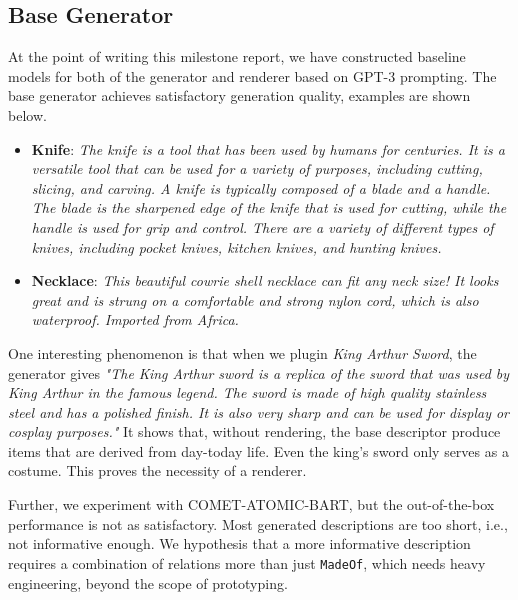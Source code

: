 \documentclass[12pt]{article}
\begin{document}
  \subsection{Base Generator}
    At the point of writing this milestone report, we have constructed baseline models for both of 
      the generator and renderer based on GPT-3 prompting. The base generator achieves satisfactory 
      generation quality, examples are shown below.
      \begin{itemize}
        \item \textbf{Knife}: \textit{The knife is a tool that has been used by humans for centuries. It is a versatile tool that can be used for a variety of purposes, 
          including cutting, slicing, and carving. A knife is typically composed of a blade and a handle. 
          The blade is the sharpened edge of the knife that is used for cutting, while the handle is used 
          for grip and control. There are a variety of different types of knives, including pocket knives, 
          kitchen knives, and hunting knives.} 
        \item \textbf{Necklace}: \textit{This beautiful cowrie shell necklace can fit any neck size! 
          It looks great and is strung on a comfortable and strong nylon cord, which is also waterproof. 
          Imported from Africa.}
      \end{itemize}

    One interesting phenomenon is that when we plugin \textit{King Arthur Sword}, the generator 
      gives \textit{"The King Arthur sword is a replica of the sword that was used by King Arthur 
      in the famous legend. The sword is made of high quality stainless steel and has a polished 
      finish. It is also very sharp and can be used for display or cosplay purposes."}
      It shows that, without rendering, the base descriptor produce items 
      that are derived from day-today life. Even the king's sword only serves as a costume. This 
      proves the necessity of a renderer.

    Further, we experiment with COMET-ATOMIC-BART, but the out-of-the-box performance is not as satisfactory. Most 
      generated descriptions are too short, i.e., not informative enough. We hypothesis that a more informative 
      description requires a combination of relations more than just \lstinline{MadeOf}, which needs 
      heavy engineering, beyond the scope of prototyping.
\end{document}
